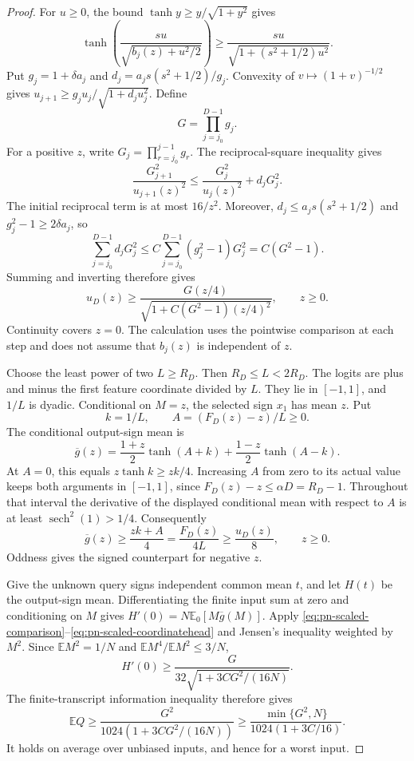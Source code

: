 \begin{proof}
For $u\ge0$, the bound $\tanh y\ge y/\sqrt{1+y^2}$ gives
\[
 \tanh\!\left(\frac{s u}{\sqrt{b_j(z)+u^2/2}}\right)
 \ge\frac{s u}{\sqrt{1+(s^2+1/2)u^2}}.
\]
Put $g_j=1+\delta a_j$ and
$d_j=a_js(s^2+1/2)/g_j$. Convexity of
$v\mapsto(1+v)^{-1/2}$ gives
$u_{j+1}\ge g_ju_j/\sqrt{1+d_ju_j^2}$. Define
\[
 G=\prod_{j=j_0}^{D-1}g_j.
\]
For a positive $z$, write $G_j=\prod_{r=j_0}^{j-1}g_r$. The
reciprocal-square inequality gives
\[
 \frac{G_{j+1}^2}{u_{j+1}(z)^2}
 \le\frac{G_j^2}{u_j(z)^2}+d_jG_j^2.
\]
The initial reciprocal term is at most $16/z^2$. Moreover,
$d_j\le a_js(s^2+1/2)$ and $g_j^2-1\ge2\delta a_j$, so
\[
 \sum_{j=j_0}^{D-1}d_jG_j^2
 \le C\sum_{j=j_0}^{D-1}(g_j^2-1)G_j^2=C(G^2-1).
\]
Summing and inverting therefore gives
\begin{equation}
 u_D(z)\ge
 \frac{G(z/4)}{\sqrt{1+C(G^2-1)(z/4)^2}},\qquad z\ge0.
 \label{eq:pn-scaled-comparison}
\end{equation}
Continuity covers $z=0$. The calculation uses the pointwise comparison
at each step and does not assume that $b_j(z)$ is independent of $z$.

Choose the least power of two $L\ge R_D$. Then $R_D\le L<2R_D$.
The logits are plus and minus the first feature coordinate divided
by $L$. They lie in $[-1,1]$, and $1/L$ is dyadic. Conditional on
$M=z$, the selected sign $x_1$ has mean $z$. Put
\[
 k=1/L,\qquad A=(F_D(z)-z)/L\ge0.
\]
The conditional output-sign mean is
\[
 \overline g(z)
 =\frac{1+z}{2}\tanh(A+k)+
   \frac{1-z}{2}\tanh(A-k).
\]
At $A=0$, this equals $z\tanh k\ge zk/4$. Increasing $A$ from zero
to its actual value keeps both arguments in $[-1,1]$, since
$F_D(z)-z\le\alpha D=R_D-1$. Throughout that interval the derivative
of the displayed conditional mean with respect to $A$ is at least
$\operatorname{sech}^2(1)>1/4$. Consequently
\begin{equation}
 \overline g(z)\ge\frac{zk+A}{4}
 =\frac{F_D(z)}{4L}\ge\frac{u_D(z)}8,\qquad z\ge0.
 \label{eq:pn-scaled-coordinatehead}
\end{equation}
Oddness gives the signed counterpart for negative $z$.

Give the unknown query signs independent common mean $t$, and let
$H(t)$ be the output-sign mean. Differentiating the finite input sum
at zero and conditioning on $M$ gives
$H'(0)=N\mathbb E_0[M\overline g(M)]$. Apply
\eqref{eq:pn-scaled-comparison}--\eqref{eq:pn-scaled-coordinatehead}
and Jensen's inequality weighted by $M^2$. Since
$\mathbb E M^2=1/N$ and $\mathbb E M^4/\mathbb E M^2\le3/N$,
\[
 H'(0)\ge\frac{G}{32\sqrt{1+3CG^2/(16N)}}.
\]
The finite-transcript information inequality therefore gives
\[
 \mathbb E Q\ge
 \frac{G^2}{1024(1+3CG^2/(16N))}
 \ge\frac{\min\{G^2,N\}}{1024(1+3C/16)}.
\]
It holds on average over unbiased inputs, and hence for a worst input.


\end{proof}
